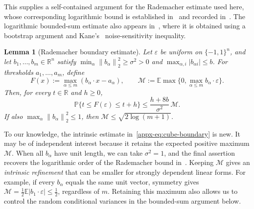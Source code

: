 \documentclass[11pt,letterpaper,twoside,leqno]{article}
\theoremstyle{bookplain}
\newtheorem{lemma}{Lemma}
\theoremstyle{bookremark}
\newcommand{\E}{\mathbb E}
\newcommand{\Pp}{\mathbb P}
\newcommand{\R}{\mathbb R}
\newcommand{\norm}[1]{\left\lVert#1\right\rVert}
\begin{document}
This supplies a self-contained argument for the Rademacher estimate
used here, whose corresponding logarithmic bound is established
in~\cite{OST} and recorded in~\cite[Lemma~J.4]{CCKK2022}.
The logarithmic bounded-sum estimate also appears
in~\cite[Lemma~2.1]{AL}, where it is obtained using a bootstrap
argument and Kane's~\cite{Kane} noise-sensitivity inequality.

\begin{lemma}[Rademacher boundary estimate]\label{appx-lem:cube-boundary}
Let $\varepsilon$ be uniform on $\{-1,1\}^n$, and let
$b_1,\ldots,b_m\in\R^n$ satisfy
$\min_\alpha\norm{b_\alpha}_2^2\ge\sigma^2>0$ and
$\max_{\alpha,i}|b_{\alpha i}|\le b$.
For thresholds $a_1,\ldots,a_m$, define
\[
 F(x):=\max_{\alpha\le m}(b_\alpha\cdot x-a_\alpha),
 \qquad
 \mathcal M:=\E\max\{0,\max_{\alpha\le m}b_\alpha\cdot\varepsilon\}.
\]
Then, for every $t\in\R$ and $h\ge0$,
\begin{equation}
 \Pp\{t\le F(\varepsilon)\le t+h\}
 \le\frac{h+8b}{\sigma^2}\,\mathcal M.
 \label{appx-eq:cube-boundary}
\end{equation}
If also $\max_\alpha\norm{b_\alpha}_2^2\le1$, then
$\mathcal M\le\sqrt{2\log(m+1)}$.
\end{lemma}

To our knowledge, the intrinsic estimate in~\eqref{appx-eq:cube-boundary}
is new. It may be of independent interest because it retains the
expected positive maximum $\mathcal M$.
When all $b_\alpha$ have unit length, we can take $\sigma^2=1$,
and the final assertion recovers the logarithmic order of the
Rademacher bound in~\cite{OST,CCKK2022}. Keeping $\mathcal M$
gives an \emph{intrinsic refinement} that can be smaller for strongly
dependent linear forms. For example, if every $b_\alpha$ equals
the same unit vector, symmetry gives
$\mathcal M=\tfrac12\E|b_1\cdot\varepsilon|\le\tfrac12$,
regardless of $m$. Retaining this maximum also allows us to control
the random conditional variances in the bounded-sum argument below.
\end{document}
